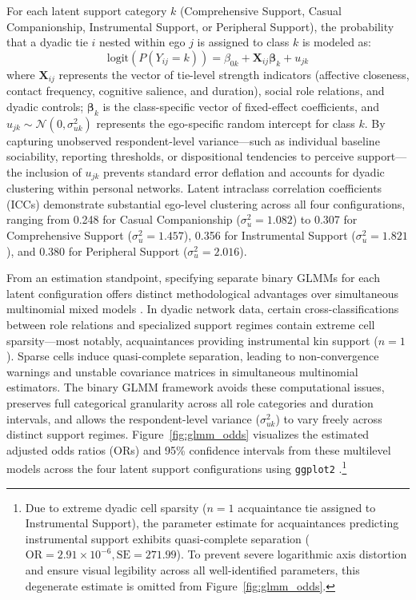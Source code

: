 \documentclass[12pt]{article}
\begin{document}
For each latent support category $k$ (Comprehensive Support, Casual Companionship, Instrumental Support, or Peripheral Support), the probability that a dyadic tie $i$ nested within ego $j$ is assigned to class $k$ is modeled as:
\begin{equation}
\text{logit}(P(Y_{ij} = k)) = \beta_{0k} + \mathbf{X}_{ij}\boldsymbol{\beta}_k + u_{jk}
\end{equation}
where $\mathbf{X}_{ij}$ represents the vector of tie-level strength indicators (affective closeness, contact frequency, cognitive salience, and duration), social role relations, and dyadic controls; $\boldsymbol{\beta}_k$ is the class-specific vector of fixed-effect coefficients, and $u_{jk} \sim \mathcal{N}(0, \sigma_{uk}^2)$ represents the ego-specific random intercept for class $k$. By capturing unobserved respondent-level variance---such as individual baseline sociability, reporting thresholds, or dispositional tendencies to perceive support---the inclusion of $u_{jk}$ prevents standard error deflation and accounts for dyadic clustering within personal networks. Latent intraclass correlation coefficients (ICCs) demonstrate substantial ego-level clustering across all four configurations, ranging from 0.248 for Casual Companionship ($\sigma_u^2 = 1.082$) to 0.307 for Comprehensive Support ($\sigma_u^2 = 1.457$), 0.356 for Instrumental Support ($\sigma_u^2 = 1.821$), and 0.380 for Peripheral Support ($\sigma_u^2 = 2.016$).

From an estimation standpoint, specifying separate binary GLMMs for each latent configuration offers distinct methodological advantages over simultaneous multinomial mixed models \citep[such as \texttt{mblogit};][]{elff2025mclogit}. In dyadic network data, certain cross-classifications between role relations and specialized support regimes contain extreme cell sparsity---most notably, acquaintances providing instrumental kin support ($n = 1$). Sparse cells induce quasi-complete separation, leading to non-convergence warnings and unstable covariance matrices in simultaneous multinomial estimators. The binary GLMM framework avoids these computational issues, preserves full categorical granularity across all role categories and duration intervals, and allows the respondent-level variance ($\sigma_{uk}^2$) to vary freely across distinct support regimes. Figure~\ref{fig:glmm_odds} visualizes the estimated adjusted odds ratios (ORs) and 95\% confidence intervals from these multilevel models across the four latent support configurations using \texttt{ggplot2} \citep{wickham2016ggplot2}.\footnote{Due to extreme dyadic cell sparsity ($n = 1$ acquaintance tie assigned to Instrumental Support), the parameter estimate for acquaintances predicting instrumental support exhibits quasi-complete separation ($\text{OR} = 2.91 \times 10^{-6}, \text{SE} = 271.99$). To prevent severe logarithmic axis distortion and ensure visual legibility across all well-identified parameters, this degenerate estimate is omitted from Figure~\ref{fig:glmm_odds}.}
\end{document}
